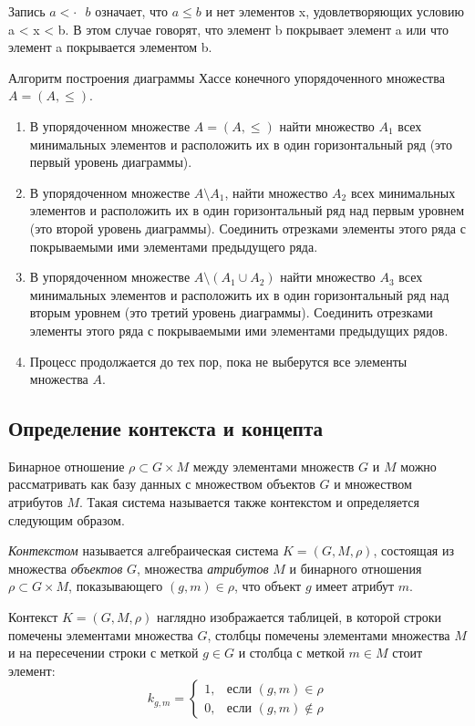 \documentclass[spec, och, labwork]{shiza}
\begin{document}
        Запись $a <\cdot \text{ } b$ означает, что $a \leq b$ и нет элементов x, удовлетворяющих условию a < x < b. В этом случае говорят, что
        элемент b покрывает элемент a или что элемент a покрывается элементом b.

        Алгоритм построения диаграммы Хассе конечного упорядоченного множества $A = (A, \leq)$.

        \begin{enumerate}
            \item В упорядоченном множестве $A = (A, \leq)$ найти множество $A_1$ всех минимальных элементов и расположить их в один горизонтальный ряд (это первый уровень диаграммы).
            \item В упорядоченном множестве $A \setminus A_1$, найти множество $A_2$ всех минимальных элементов и
            расположить их в один горизонтальный ряд над первым уровнем (это второй уровень диаграммы). Соединить
            отрезками элементы этого ряда с покрываемыми ими элементами предыдущего ряда.
            \item В упорядоченном множестве $A \setminus (A_1 \cup A_2)$ найти множество $A_3$ всех минимальных
            элементов и расположить их в один горизонтальный ряд над вторым уровнем (это третий уровень диаграммы).
            Соединить отрезками элементы этого ряда с покрываемыми ими элементами предыдущих рядов.
            \item Процесс продолжается до тех пор, пока не выберутся все элементы множества $A$.
        \end{enumerate}

    \subsection{Определение контекста и концепта}

    Бинарное отношение $\rho \subset G\times M$ между элементами множеств $G$ и $M$
    можно рассматривать как базу данных с множеством объектов $G$ и множеством
    атрибутов $M$. Такая система называется также контекстом и определяется следующим
    образом.
    
    \textit{Контекстом} называется алгебраическая система $K=(G,M,\rho)$, состоящая
    из множества \textit{объектов} $G$, множества \textit{атрибутов} $M$ и бинарного
    отношения $\rho \subset G\times M$, показывающего $(g,m)\in\rho$, что объект $g$
    имеет атрибут $m$.
    
    Контекст $K = (G,M,\rho)$ наглядно изображается таблицей, в которой строки
    помечены элементами множества $G$, столбцы помечены элементами множества $M$ и
    на пересечении строки с меткой $g \in G$ и столбца с меткой $m \in M$ стоит 
    элемент:
    \begin{equation*}
        k_{g,m} = 
            \begin{cases}
                1, &\text{если $(g,m) \in \rho$}\\
                0, &\text{если  $(g,m) \not\in \rho$}
            \end{cases}
    \end{equation*}
    
\end{document}
